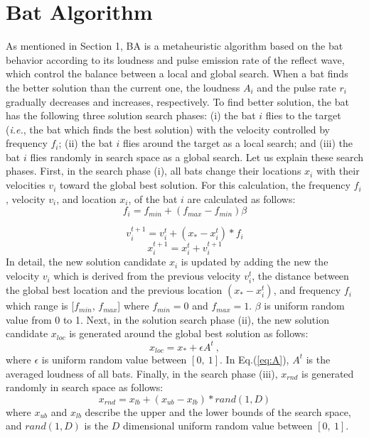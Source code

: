 \documentclass[conference]{IEEEtran}
\begin{document}
\section{Bat Algorithm}
As mentioned in Section 1, BA is a metaheuristic algorithm based on the bat behavior according to its loudness and pulse emission rate of the reflect wave, which control the balance between a local and global search. When a bat finds the better solution than the current one, the loudness $A_i$ and the pulse rate $r_i$ gradually decreases and increases, respectively. To find better solution, the bat has the following three solution search phases: (i) the bat $i$ flies to the target (\textit{i.e.}, the bat which finds the best solution) with the velocity controlled by frequency $f_i$; (ii) the bat $i$ flies around the target as a local search; and (iii) the bat $i$ flies randomly in search space as a global search.
Let us explain these search phases.
First, in the search phase (i), all bats change their locations $x_i$ with their velocities $v_i$ toward the global best solution. For this calculation, the frequency $f_i$, velocity $v_i$, and location $x_i$, of the bat $i$ are calculated as follows:
\begin{equation}
f_{i} =f_{min}+(f_{max}-f_{min}) \beta
\label{eq:freq} 
\end{equation}

\begin{equation}
v_i^{t+1}=v_i^t+(x_*-x_i^t)* f_i
\label{eq:vi}
\end{equation}
\begin{equation}
x_i^{t+1}=x_i^t+v_i^{t+1}
\label{eq:xi}
\end{equation}
In detail, the new solution candidate $x_i$ is updated by adding the new the velocity ${v_i}$ which is derived from the previous velocity $v_i^t$, the distance between the global best location and the previous location $(x_*-x_i^t)$, and frequency $f_i$ which range is [${f_{min}}$, ${f_{max}}$] where ${f_{min}}=0$ and ${f_{max}}=1$. $\beta $ is uniform random value from 0 to 1. Next, in the solution search phase (ii), the new solution candidate $x_{loc}$ is generated around the global best solution as follows:
\begin{equation}
x_{loc}=x_{*}+ \epsilon A^t \ ,
\label{eq:loc}
\end{equation}
where ${\epsilon}$ is uniform random value between ${[0,  \ 1]}$. In Eq.(\ref{eq:A}), ${A^t}$ is the averaged loudness of all bats. Finally, in the search phase (iii), $x_{rnd}$ is generated randomly in search space as follows:
\begin{equation}
\label{eq:xrnd}
x_{rnd}=x_{lb}+(x_{ub}-x_{lb})*rand(1,D)
\end{equation}
where $x_{ub}$ and $x_{lb}$ describe the upper and the lower bounds of the search space, and $rand(1,D)$ is the $D$ dimensional uniform random value between $[0, \ 1]$. 
\end{document}
